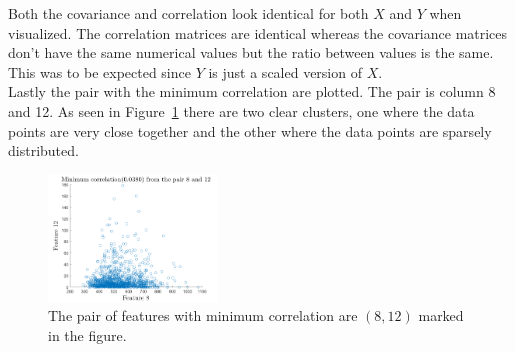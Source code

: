 \documentclass{article}
\begin{document}
\noindent Both the covariance and correlation look identical for both $X$ and $Y$ when visualized. The correlation matrices are identical whereas the covariance matrices don't have the same numerical values but the ratio between values is the same. This was to be expected since $Y$ is just a scaled version of $X$.\\
Lastly the pair with the minimum correlation are plotted. The pair is column 8 and 12. As seen in Figure~\ref{fig:scatter} there are two clear clusters, one where the data points are very close together and the other where the data points are sparsely distributed.

\begin{figure}[H]
    \centering
    \includegraphics[width=0.4\textwidth]{Figures/plot2_2_scatter.png}
    \caption{The pair of features with minimum correlation are $(8,12)$ marked in the figure. }
    \label{fig:scatter}
\end{figure}
\end{document}
